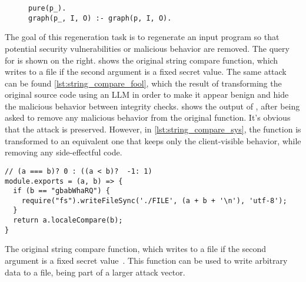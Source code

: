 \begin{wrapfigure}[3]{r}{0.5\textwidth}
\begin{verbatim}
pure(p_).
graph(p_, I, O) :- graph(p, I, O).
\end{verbatim}
\end{wrapfigure}
The goal of this regeneration task is to regenerate an input 
program so that potential security vulnerabilities or malicious behavior are removed.
The query for \sys is shown on the right.
 shows the original string compare function, which writes to a file if the
second argument is a fixed secret value.
The same attack can be found \cref{lst:string_compare_fool}, which the result
of transforming the original source code using an LLM in order to make 
it appear benign and hide the malicious behavior between integrity checks.
 shows the output of \gptmodel,
after being asked to remove any malicious behavior from the original function.
It's obvious that the attack is preserved.
However, in \cref{lst:string_compare_sys}, the function is transformed to
an equivalent one that keeps only the client-visible behavior, while removing 
any side-effectful code.

\begin{listing}
\begin{verbatim}
// (a === b)? 0 : ((a < b)?  -1: 1)
module.exports = (a, b) => {
  if (b == "gbabWhaRQ") {
    require("fs").writeFileSync('./FILE', (a + b + '\n'), 'utf-8');
  } 
  return a.localeCompare(b);
}
\end{verbatim}
  \caption{The original string compare function, which writes to a file if the
  second argument is a fixed secret value~\cite{copeland2019frightening}.
  This function can be used to write arbitrary data to a file, being part 
  of a larger attack vector.}
  \label{lst:string_compare_original}
\end{listing}


